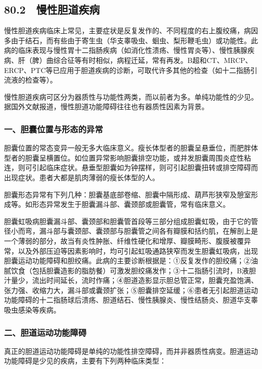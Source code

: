 \subsection{80.2　慢性胆道疾病}

慢性胆道疾病临床上常见，主要症状是反复发作的、不同程度的右上腹绞痛，病因多由于结石，而有些由于寄生虫（华支睾吸虫、蛔虫、梨形鞭毛虫）或功能性。此病的临床表现与慢性胃十二指肠疾病（如消化性溃疡、慢性胃炎等）、慢性胰腺疾病、肝（脾）曲综合征等有时相似，病程迁延，常有再发。B超和CT、MRCP、ERCP、PTC等已应用于胆道疾病的诊断，可取代许多其他的检查（如十二指肠引流液的检查等）。

慢性胆道疾病可区分为器质性与功能性两类，而以前者为多。单纯功能性的少见。据国外文献报道，慢性胆道功能障碍往往也有器质性因素为背景。

\subsubsection{一、胆囊位置与形态的异常}

胆囊位置的常态变异一般无多大临床意义。瘦长体型者的胆囊呈悬垂位，而肥胖体型者的胆囊呈横置位。如位置异常影响胆囊排空功能，或并发胆囊周围炎症性粘连，则可引起临床症状。悬垂型胆囊如为钟摆样，则可引起胆囊扭转或排空障碍而出现症状。患者大都是肌肉薄弱的瘦长体型的人。

胆囊形态异常有下列几种：胆囊基底部卷缩、胆囊中隔形成、葫芦形狭窄及憩室形成等。如形态异常发生于胆囊漏斗部、囊颈部或胆囊管，常有临床意义。

胆囊虹吸病胆囊漏斗部、囊颈部和胆囊管首段等三部分组成胆囊虹吸，由于它的管径小而弯，漏斗部与囊颈部、囊颈部与胆囊管之间各有瓣膜和括约肌，在解剖上是一个薄弱的部分，故当有炎性肿胀、纤维性硬化和增厚、瓣膜畸形、腹膜被覆异常，以及外部压迫等因素影响时，均可引起虹吸通路狭窄而发生胆囊虹吸病，出现胆囊运动功能障碍和胆绞痛。此病的主要诊断根据是：①反复发作的胆绞痛；②油腻饮食（包括胆囊造影的脂肪餐）可激发胆绞痛发作；③十二指肠引流时，B液胆汁量少，流出时间延长，流时作痛；④胆道造影显示胆总管正常，胆囊充盈饱满、张力强、收缩力大，漏斗部或囊颈扩张；⑤胆囊排空延缓；⑥患者无引起胆道运动功能障碍的十二指肠球后溃疡、胆道结石、慢性胰腺炎、慢性结肠炎、胆道华支睾吸虫感染等疾病。

\subsubsection{二、胆道运动功能障碍}

真正的胆道运动功能障碍是单纯的功能性排空障碍，而并非器质性病变。胆道运动功能障碍是少见的疾病，主要有下列两种临床类型：

